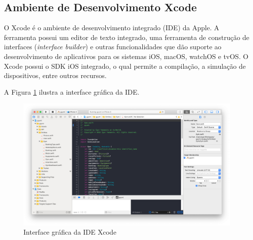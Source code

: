 \subsection{Ambiente de Desenvolvimento Xcode}
O Xcode é o ambiente de desenvolvimento integrado (IDE) da Apple. A ferramenta possui um editor de texto integrado, uma ferramenta de construção de interfaces (\textit{interface builder}) e outras funcionalidades que dão suporte ao desenvolvimento de aplicativos para os sistemas iOS, macOS, watchOS e tvOS. O Xcode possui o SDK iOS integrado, o qual permite a compilação, a simulação de dispositivos, entre outros recursos.

A Figura \ref{fig:xcode} ilustra a interface gráfica da IDE.
\begin{figure}[h]
    \centering
    \includegraphics[width=\textwidth]{pfc/figuras/xcode.png}
    \caption{Interface gráfica da IDE Xcode}
    \label{fig:xcode}
\end{figure}

